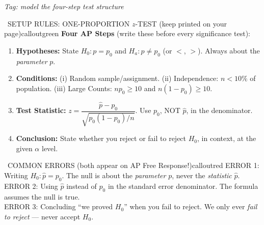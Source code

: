 \documentclass[11pt]{article}
\newcommand{\phasetag}[1]{{\small\itshape Tag: #1\par}}
\begin{document}
\phasetag{model the four-step test structure}

\begin{callout}{\IconBook\ SETUP RULES: ONE-PROPORTION \(z\)-TEST (keep printed on your page)}{calloutgreen}
\textbf{Four AP Steps} (write these before every significance test):
\begin{enumerate}[leftmargin=2.1em,itemsep=1pt,topsep=3pt]
  \item \textbf{Hypotheses:} State \(H_0\!: p = p_0\) and \(H_a\!: p \neq p_0\) (or \(<\), \(>\)). Always about the \textit{parameter} \(p\).
  \item \textbf{Conditions:} (i) Random sample/assignment. (ii) Independence: \(n < 10\%\) of population. (iii) Large Counts: \(np_0 \geq 10\) and \(n(1-p_0) \geq 10\).
  \item \textbf{Test Statistic:} \(z = \dfrac{\hat{p} - p_0}{\sqrt{p_0(1-p_0)/n}}\). Use \(p_0\), NOT \(\hat{p}\), in the denominator.
  \item \textbf{Conclusion:} State whether you reject or fail to reject \(H_0\), in context, at the given \(\alpha\) level.
\end{enumerate}
\end{callout}

\begin{callout}{\IconWarn\ COMMON ERRORS (both appear on AP Free Response!)}{calloutred}
ERROR 1: Writing \(H_0\!: \hat{p} = p_0\). The null is about the \textit{parameter} \(p\), never the \textit{statistic} \(\hat{p}\).\\
ERROR 2: Using \(\hat{p}\) instead of \(p_0\) in the standard error denominator. The formula assumes the null is true.\\
ERROR 3: Concluding ``we proved \(H_0\)'' when you fail to reject. We only ever \textit{fail to reject} --- never accept \(H_0\).
\end{callout}
\end{document}
